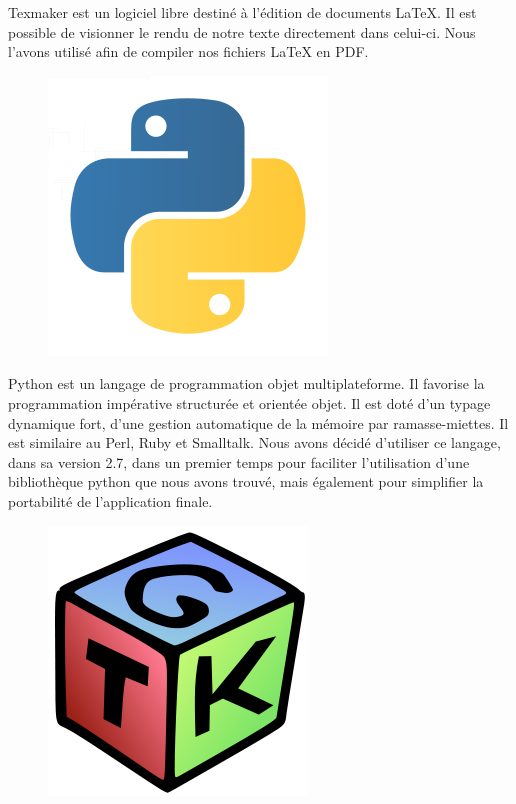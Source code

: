 ﻿\documentclass[17pts]{report}
\begin{document}
Texmaker est un logiciel libre destiné à l'édition de documents LaTeX.
Il est possible de visionner le rendu de notre texte directement dans celui-ci.
Nous l'avons utilisé afin de compiler nos fichiers LaTeX en PDF.\\

\begin{figure}[H]
    \includegraphics[scale=0.2]{illustrations/python.png}
    \centering
\end{figure}

Python est un langage de programmation objet multiplateforme.  Il favorise la
programmation impérative structurée et orientée objet. Il est doté d'un typage
dynamique fort, d'une gestion automatique de la mémoire par ramasse-miettes. Il
est similaire au Perl, Ruby et Smalltalk.  Nous avons décidé d'utiliser ce
langage, dans sa version 2.7, dans un premier temps pour faciliter
l'utilisation d'une bibliothèque python que nous avons trouvé, mais également
pour simplifier la portabilité de l'application finale.\\

\begin{figure}[H]
    \includegraphics[scale=0.2]{illustrations/gtk.png}
    \centering
\end{figure}
\end{document}
